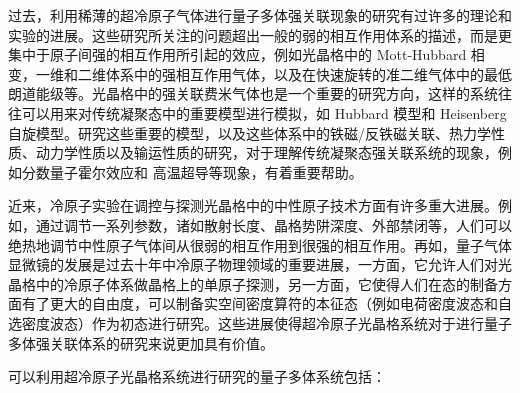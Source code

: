 过去，利用稀薄的超冷原子气体进行量子多体强关联现象的研究有过许多的理论和实验的进展\cite{bloch2008}。这些研究所关注的问题超出一般的弱的相互作用体系的描述，而是更集中于原子间强的相互作用所引起的效应，例如光晶格中的 Mott-Hubbard 相变，一维和二维体系中的强相互作用气体，以及在快速旋转的准二维气体中的最低朗道能级等。光晶格中的强关联费米气体也是一个重要的研究方向，这样的系统往往可以用来对传统凝聚态中的重要模型进行模拟，如 Hubbard 模型和 Heisenberg 自旋模型。研究这些重要的模型，以及这些体系中的铁磁/反铁磁关联、热力学性质、动力学性质以及输运性质的研究，对于理解传统凝聚态强关联系统的现象，例如分数量子霍尔效应和 高温超导等现象，有着重要帮助\cite{nagaosa}。

近来，冷原子实验在调控与探测光晶格中的中性原子技术方面有许多重大进展。例如，通过调节一系列参数，诸如散射长度、晶格势阱深度、外部禁闭等，人们可以绝热地调节中性原子气体间从很弱的相互作用到很强的相互作用。再如，量子气体显微镜的发展是过去十年中冷原子物理领域的重要进展\cite{microscope1,microscope2,microscope3,microscope4,microscope5,microscope6}，一方面，它允许人们对光晶格中的冷原子体系做晶格上的单原子探测，另一方面，它使得人们在态的制备方面有了更大的自由度，可以制备实空间密度算符的本征态（例如电荷密度波态和自选密度波态）作为初态进行研究。这些进展使得超冷原子光晶格系统对于进行量子多体强关联体系的研究来说更加具有价值。

可以利用超冷原子光晶格系统进行研究的量子多体系统包括\cite{olbook}：

